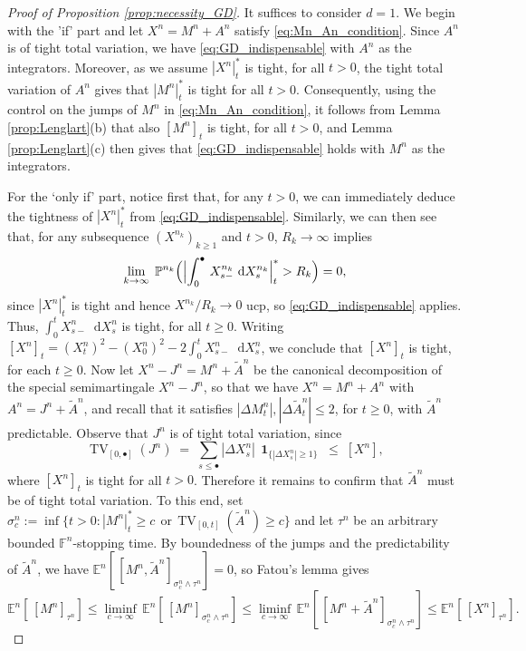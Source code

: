 \documentclass[11pt]{article}
\theoremstyle{definition}\newtheorem{example}[theorem]{Example}
\theoremstyle{definition}\newtheorem{counterexample}[theorem]{Counterexample}
\theoremstyle{definition}\newtheorem{remark}[theorem]{Remark}
\theoremstyle{definition}\newtheorem{defi}[theorem]{Definition}
\numberwithin{equation}{section}
\newcommand*\diff{\mathop{}\!\mathrm{d}}								%
\newcommand{\ind}{\operatorname{\mathbf{1}}}							%
\renewcommand{\|}{\; : \, \;}											%
\begin{document}
\begin{proof}[Proof of Proposition \ref{prop:necessity_GD}]It suffices to consider $d=1$. 
	We begin with the 'if' part and let $X^n=M^n+A^n$ satisfy \eqref{eq:Mn_An_condition}. Since $A^n$ is of tight total variation, we have \eqref{eq:GD_indispensable} with $A^n$ as the integrators. Moreover, as we assume $|X^n|_t^*$ is tight, for all $t>0$, the tight total variation of $A^n$ gives that $|M^n|_t^*$ is tight for all $t>0$. Consequently, using the control on the jumps of $M^n$ in \eqref{eq:Mn_An_condition}, it follows from Lemma \ref{prop:Lenglart}(b) that also $[M^n]_t$ is tight, for all $t>0$, and Lemma \ref{prop:Lenglart}(c) then gives that \eqref{eq:GD_indispensable} holds with $M^n$ as the integrators.
	
	For the `only if' part, notice first that, for any $t>0$, we can immediately deduce the tightness of $|X^n|^*_t$ from \eqref{eq:GD_indispensable}. Similarly, we can then see that, for any subsequence $(X^{n_k})_{k\geq1}$ and $t>0$, $R_k \rightarrow \infty$ implies
	\[
	\lim_{k\rightarrow \infty} \; \mathbb{P}^{n_k}\Bigl( \Bigl| \int_0^\bullet \, X^{n_k}_{s-} \,\diff X^{n_k}_s \Bigr|_t^* > R_k  \Bigr)=0,
	\]
	since $|X^{n}|_t^*$ is tight and hence $X^{n_k}/R_k \rightarrow 0$ ucp, so \eqref{eq:GD_indispensable} applies. Thus, $\int_0^t X^n_{s-} \diff X^n_s$ is tight, for all $t\geq0$. Writing $[X^n]_t=(X^n_t)^2-(X_0^n)^2 - 2\int_0^t X^n_{s-} \diff X^n_s$, we conclude that $[X^n]_t$ is tight, for each $t\geq0$. Now let $X^n-J^n=M^n+\tilde{A}^n$ be the canonical decomposition of the special semimartingale $X^n-J^n$, so that we have $X^n=M^n +A^n$ with $A^n=J^n + \tilde{A}^n$, and recall that it satisfies $|\Delta M^n_t|,|\Delta \tilde{A}^n_t| \leq 2$, for $t\geq 0$, with $\tilde{A}^n$ predictable. Observe that $J^n$ is of tight total variation, since
	$$ \operatorname{TV}_{[0,\bullet]}(J^n) \; =\;  \sum_{s \leq \bullet} |\Delta X^n_s| \, \ind_{\{|\Delta X^n_s|\geq 1\}} \; \leq \; [X^n],$$
	where $[X^n]_t$ is tight for all $t>0$. Therefore it remains to confirm that $\tilde{A}^n$ must be of tight total variation. To this end, set $\sigma^n_c := \operatorname{inf} \{ t>0 : |M^n|^*_t \geq c \,\; \text{or}\, \operatorname{TV}_{[0,t]}(\tilde{A}^{n}) \geq c \}$ and let $\tau^n$ be an arbitrary bounded $\mathbb{F}^n$-stopping time. By boundedness of the jumps and the predictability of $\tilde{A}^n$, we have $\mathbb{E}^n[\, [M^n,\tilde{A}^n]_{\sigma^n_c \land \tau^n}]=0$, so Fatou's lemma gives
	\[
	\mathbb{E}^n[\, [M^n]_{\tau^n}] \leq \liminf_{c \rightarrow \infty} \, \mathbb{E}^n[\, [M^n]_{\sigma^n_c \land \tau^n}] \leq \liminf_{c \rightarrow \infty} \, \mathbb{E}^n[\, [M^n+\tilde{A}^n]_{\sigma^n_c \land \tau^n}] \leq \mathbb{E}^n[\, [X^n]_{\tau^n}].
\]
\end{proof}
\end{document}
